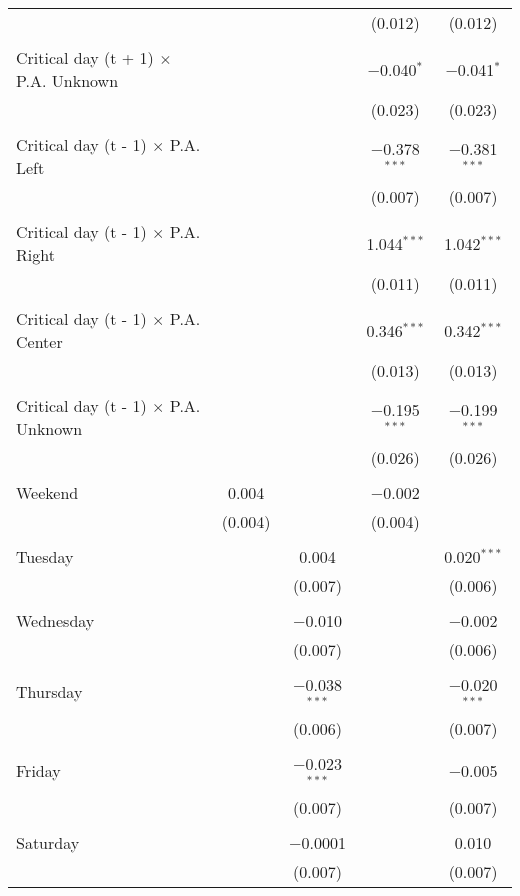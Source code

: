 \documentclass[
]{article}
\begin{document}
\begin{table}[!htbp]
{\begin{tabular}{@{\extracolsep{5pt}}lcccc}
  &  &  & (0.012) & (0.012) \\ 
  & & & & \\ 
 Critical day (t + 1) $\times$ P.A. Unknown &  &  & $-$0.040$^{*}$ & $-$0.041$^{*}$ \\ 
  &  &  & (0.023) & (0.023) \\ 
  & & & & \\ 
 Critical day (t - 1) $\times$ P.A. Left &  &  & $-$0.378$^{***}$ & $-$0.381$^{***}$ \\ 
  &  &  & (0.007) & (0.007) \\ 
  & & & & \\ 
 Critical day (t - 1) $\times$ P.A. Right &  &  & 1.044$^{***}$ & 1.042$^{***}$ \\ 
  &  &  & (0.011) & (0.011) \\ 
  & & & & \\ 
 Critical day (t - 1) $\times$ P.A. Center &  &  & 0.346$^{***}$ & 0.342$^{***}$ \\ 
  &  &  & (0.013) & (0.013) \\ 
  & & & & \\ 
 Critical day (t - 1) $\times$ P.A. Unknown &  &  & $-$0.195$^{***}$ & $-$0.199$^{***}$ \\ 
  &  &  & (0.026) & (0.026) \\ 
  & & & & \\ 
 Weekend & 0.004 &  & $-$0.002 &  \\ 
  & (0.004) &  & (0.004) &  \\ 
  & & & & \\ 
 Tuesday &  & 0.004 &  & 0.020$^{***}$ \\ 
  &  & (0.007) &  & (0.006) \\ 
  & & & & \\ 
 Wednesday &  & $-$0.010 &  & $-$0.002 \\ 
  &  & (0.007) &  & (0.006) \\ 
  & & & & \\ 
 Thursday &  & $-$0.038$^{***}$ &  & $-$0.020$^{***}$ \\ 
  &  & (0.006) &  & (0.007) \\ 
  & & & & \\ 
 Friday &  & $-$0.023$^{***}$ &  & $-$0.005 \\ 
  &  & (0.007) &  & (0.007) \\ 
  & & & & \\ 
 Saturday &  & $-$0.0001 &  & 0.010 \\ 
  &  & (0.007) &  & (0.007) \\ 

\end{tabular}}
\end{table}
\end{document}
